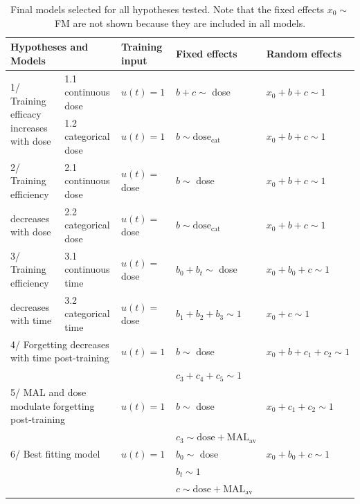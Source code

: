 \begin{table}[b]
	\footnotesize
	\begin{tabular}{|l|l|l|l|l|}
		\hline
		\multicolumn{2}{|l|}{Hypotheses and Models} & Training input & Fixed effects & Random effects \\
		\hline
		\multirow{2}{3cm}{1/ Training efficacy increases with dose}  & 1.1 continuous dose & $ u(t) = 1 $ & $ b + c \sim $ dose & $ x_0 + b + c \sim 1 $ \\
		\cline{2-5}
		 						& 1.2 categorical dose & $ u(t) = 1 $ & $ b \sim \text{dose}_\text{cat} $ & $ x_0 + b + c \sim 1 $ \\
		\hline
		2/ Training efficiency & 2.1 continuous dose & $ u(t) = $ dose & $ b \sim $ dose & $ x_0 + b + c \sim 1 $ \\ \cline{2-5}		
		decreases with dose & 2.2 categorical dose & $ u(t) = $ dose & $ b \sim \text{dose}_\text{cat} $ & $ x_0 + b + c \sim 1 $ \\
		\hline
		3/ Training efficiency & 3.1 continuous time & $ u(t) = $ dose & $ b_0 + b_t \sim $ dose & $ x_0 + b_0 + c \sim 1 $ \\ \cline{2-5}
		decreases with time & 3.2 categorical time & $ u(t) = $ dose & $ b_1 + b_2 + b_3 \sim 1 $ & $ x_0 + c \sim 1 $ \\
		\hline
		\multicolumn{2}{|l|}{4/ Forgetting decreases with time post-training} & $ u(t)=1 $ & $ b \sim $ dose & $ x_0+b+c_1+c_2 \sim 1 $\\		
		\multicolumn{2}{|l|}{} && $ c_3 + c_4 + c_5 \sim 1 $ & \\ 		
		\hline
		\multicolumn{2}{|l|}{5/ MAL and dose modulate forgetting post-training} & $ u(t)=1 $ & $ b \sim $ dose & $ x_0 + c_1 + c_2 \sim 1 $\\	
		\multicolumn{2}{|l|}{} && $ c_3 \sim \text{dose} + \text{MAL}_\text{av} $ & \\ 
		\hline
		\multicolumn{2}{|l|}{6/ Best fitting model} & $ u(t)=1 $ & $ b_0 \sim $ dose & $ x_0 + b_0 + c \sim 1 $\\	
		\multicolumn{2}{|l|}{} && $ b_t \sim 1 $ & \\ 
		\multicolumn{2}{|l|}{} && $ c \sim \text{dose} + \text{MAL}_\text{av} $ & \\ 
		\hline
	\end{tabular}
	\caption[Final models selected for all hypotheses tested.]{Final models selected for all hypotheses tested. Note that the fixed effects $ x_0 \sim $ FM are not shown because they are included in all models.}
	\label{tab:models}
\end{table}

